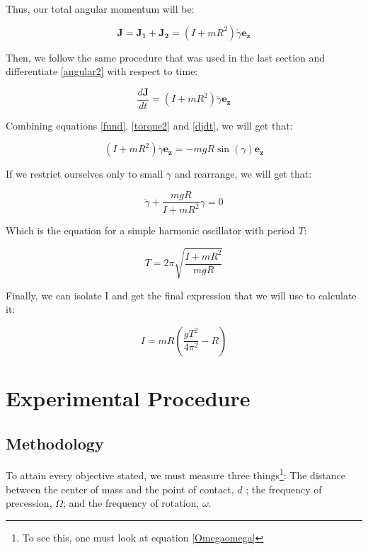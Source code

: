 \documentclass[a4paper,12pt]{article}
\begin{document}
Thus, our total angular momentum will be:

\begin{equation}
	\label{angular2}
	\boldsymbol{J} = \boldsymbol{J_1} + \boldsymbol{J_2} = \left(I + mR^2\right) \dot{\gamma} \boldsymbol{e_z} 
\end{equation}

Then, we follow the same procedure that was used in the last section and differentiate \ref{angular2} with respect to time:

\begin{equation}
	\label{djdt}
	\frac{d\boldsymbol{J}}{dt} =\left(I + mR^2\right) \ddot{\gamma} \boldsymbol{e_z}
\end{equation}

Combining equations \eqref{fund}, \eqref{torque2} and \eqref{djdt},  we will get that:

$$\left(I + mR^2\right) \ddot{\gamma} \boldsymbol{e_z} = -mgR \sin(\gamma) \boldsymbol{e_z} $$

If we restrict ourselves only to small $\gamma$ and rearrange, we will get that:

\begin{equation}
	\ddot{\gamma} + \frac{mgR}{I + mR^2} \gamma = 0
\end{equation}

Which is the equation for a simple harmonic oscillator with period $T$:

\begin{equation}
	T = 2\pi\sqrt{\frac{I + mR^2}{mgR}}
\end{equation}

Finally, we can isolate I and get the final expression that we will use to calculate it:

\begin{equation}
	\label{InertiaEq}
	I = mR\left(\frac{g T^2}{4\pi^2} - R\right)
\end{equation}

\section{Experimental Procedure}

\subsection{Methodology}
To attain every objective stated, we must measure three things\footnote{To see this, one must look at equation \eqref{Omegaomega}}:
The distance between the center of mass and the point of contact, $d$ ; the frequency of precession, $\Omega$; and the frequency of rotation, $\omega$.
\end{document}
